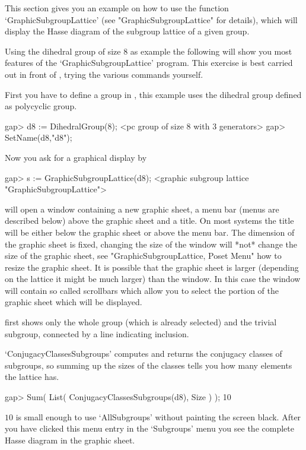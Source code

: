 
This  section   gives  you an   example    on how  to    use the function
`GraphicSubgroupLattice' (see "GraphicSubgroupLattice" for  details), which 
will  display the Hasse diagram of the subgroup lattice of a given group.

Using the dihedral group of size $8$ as example the following will show you
most features of the `GraphicSubgroupLattice' program.  This exercise is
best carried out in front of {\XGAP}, trying the various commands yourself.

First  you   have to define a  group   in {\GAP},  this example  uses the
dihedral group defined as polycyclic group.

\begintt
gap> d8 := DihedralGroup(8);
<pc group of size 8 with 3 generators>
gap> SetName(d8,"d8");
\endtt

Now you ask for a graphical display by

\begintt
gap> s := GraphicSubgroupLattice(d8);
<graphic subgroup lattice "GraphicSubgroupLattice">
\endtt

{\XGAP} will open a window containing a new graphic sheet, a menu bar
(menus are described below) above the graphic sheet and a title.  On most
systems the title will be either below the graphic sheet or above the menu
bar.  The dimension of the graphic sheet is fixed, changing the size of the
window will *not* change the size of the graphic sheet, see
"GraphicSubgroupLattice, Poset Menu" how to resize the graphic sheet.  It
is possible that the graphic sheet is larger (depending on the lattice it
might be much larger) than the window.  In this case the window will
contain so called scrollbars which allow you to select the portion of the
graphic sheet which will be displayed. 

{\XGAP} first shows only the whole group (which is already selected) and
the trivial subgroup, connected by a line indicating inclusion. 

`ConjugacyClassesSubgroups' computes and returns the conjugacy classes of
subgroups, so summing  up the sizes  of the classes   tells you how  many
elements the lattice has.

\begintt
    gap> Sum( List( ConjugacyClassesSubgroups(d8), Size ) );
    10 
\endtt

$10$ is small enough to use `AllSubgroups' without painting the screen
black.  After you have clicked this menu entry in the `Subgroups' menu you
see the complete Hasse diagram in the graphic sheet.

